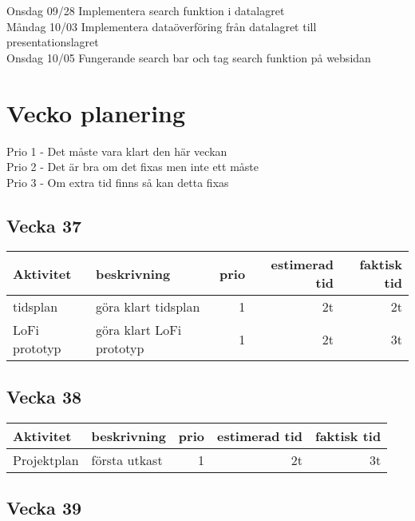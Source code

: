 \documentclass{TDP003mall}
\begin{document}
Onsdag 09/28 Implementera search funktion i datalagret
\\
Måndag 10/03 Implementera dataöverföring från datalagret till presentationslagret
\\
Onsdag 10/05 Fungerande search bar och tag search funktion på websidan

\section{Vecko planering}

Prio 1 - Det måste vara klart den här veckan
\\
Prio 2 - Det är bra om det fixas men inte ett måste
\\
Prio 3 - Om extra tid finns så kan detta fixas

\subsection{Vecka 37}
\begin{table}[!h]
  \begin{tabularx}{\linewidth}{|l|X|r|r|r|}
\hline

Aktivitet & beskrivning & prio & estimerad tid & faktisk tid \\\hline
tidsplan & göra klart tidsplan & 1 & 2t & 2t\\\hline
LoFi prototyp & göra klart LoFi prototyp & 1 & 2t & 3t \\\hline

\end{tabularx}
\end{table}

\subsection{Vecka 38}

\begin{table}[!h]
  \begin{tabularx}{\linewidth}{|l|X|r|r|r|}
\hline

Aktivitet & beskrivning & prio & estimerad tid & faktisk tid \\\hline
Projektplan & första utkast & 1 & 2t & 3t \\\hline

\end{tabularx}
\end{table}

\subsection{Vecka 39}
\end{document}
